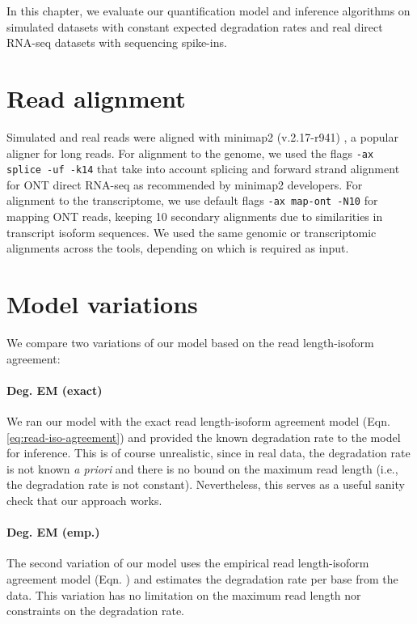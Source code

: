
In this chapter, we evaluate our quantification model and inference algorithms on simulated datasets with constant expected degradation rates and real direct RNA-seq datasets with sequencing spike-ins. 

\section{Read alignment}

Simulated and real reads were aligned with minimap2 (v.2.17-r941) \cite{Minimap2018, Minimap2021}, a popular aligner for long reads. For alignment to the genome, we used the flags \texttt{-ax splice -uf -k14} that take into account splicing and forward strand alignment for ONT direct RNA-seq as recommended by minimap2 developers. For alignment to the transcriptome, we use default flags \texttt{-ax map-ont -N10} for mapping ONT reads, keeping 10 secondary alignments due to similarities in transcript isoform sequences. We used the same genomic or transcriptomic alignments across the tools, depending on which is required as input.   

\section{Model variations}

We compare two variations of our model based on the read length-isoform agreement:

\paragraph{Deg. EM (exact)} We ran our model with the exact read length-isoform agreement model (Eqn. \ref{eq:read-iso-agreement}) and provided the known degradation rate to the model for inference. This is of course unrealistic, since in real data, the degradation rate is not known \textit{a priori} and there is no bound on the maximum read length (i.e., the degradation rate is not constant). Nevertheless, this serves as a useful sanity check that our approach works. 

\paragraph{Deg. EM (emp.)} The second variation of our model uses the empirical read length-isoform agreement model (Eqn. ) and estimates the degradation rate per base from the data. This variation has no limitation on the maximum read length nor constraints on the degradation rate. 

